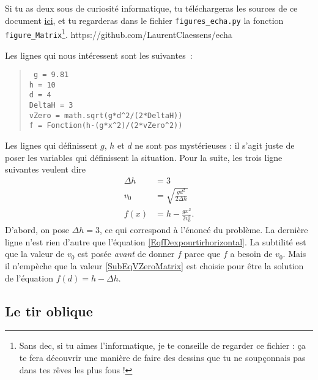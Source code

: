 Si tu as deux sous de curiosité informatique, tu téléchargeras les sources de ce document \href{https://github.com/LaurentClaessens/echa}{ici}, et tu regarderas dans le fichier \texttt{figures\_echa.py} la fonction \texttt{figure\_Matrix}\footnote{Sans dec, si tu aimes l'informatique, je te conseille de regarder ce fichier : ça te fera découvrir une manière de faire des dessins que tu ne soupçonnais pas dans tes rêves les plus fous !}.
https://github.com/LaurentClaessens/echa

Les lignes qui nous intéressent sont les suivantes~:
\begin{quote}
	\texttt{ 
	g = 9.81					\\
	h = 10						\\
	d = 4						\\
	DeltaH = 3					\\
	vZero = math.sqrt(g*d\textasciicircum 2/(2*DeltaH))		\\
	f = Fonction(h-(g*x\textasciicircum 2)/(2*vZero\textasciicircum 2))		
	}
\end{quote}
Les lignes qui définissent $g$, $h$ et $d$ ne sont pas mystérieuses : il s'agit juste de poser les variables qui définissent la situation. Pour la suite, les trois ligne suivantes veulent dire
\begin{subequations}
	\begin{align}
		\Delta h&=3\\
		v_0&=\sqrt{ \frac{ gd^2 }{ 2\Delta h } }	\label{SubEqVZeroMatrix}\\
		f(x)&=h-\frac{ gx^2 }{ 2v_0^2 }.
	\end{align}
\end{subequations}
D'abord, on pose $\Delta h=3$, ce qui correspond à l'énoncé du problème. La dernière ligne n'est rien d'autre que l'équation \eqref{EqfDexpourtirhorizontal}. La subtilité est que la valeur de $v_0$ est posée \emph{avant} de donner $f$ parce que $f$ a besoin de $v_0$. Mais il n'empèche que la valeur \eqref{SubEqVZeroMatrix} est choisie pour être la solution de l'équation $f(d)=h-\Delta h$.

\subsection{Le tir oblique}


